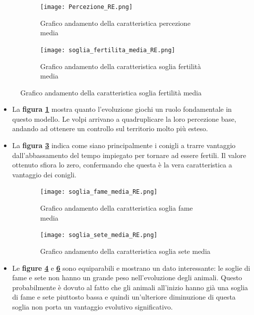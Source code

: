\documentclass[11pt]{article}
\begin{document}
\begin{figure}[h!]
	\begin{subfigure}{\textwidth}
         \centering
         \texttt{[image: Percezione\_RE.png]}
         \caption{Grafico andamento della caratteristica percezione media}
         \label{fig:percezioneRE}
	\end{subfigure}
	\begin{subfigure}{\textwidth}
		\centering
        \texttt{[image: soglia\_fertilita\_media\_RE.png]}
        \caption{Grafico andamento della caratteristica soglia fertilità media}
        \label{fig:fertilitaRE}
	\end{subfigure}
\end{figure}

\begin{itemize}


    \item La \textbf{figura \ref{fig:percezioneRE}} mostra quanto l'evoluzione giochi un ruolo fondamentale in questo modello. Le volpi arrivano a quadruplicare la loro percezione base, andando ad ottenere un controllo sul territorio molto più esteso.

    \item La \textbf{figura \ref{fig:fertilitaRE}} indica come siano principalmente i conigli a trarre vantaggio dall'abbassamento del tempo impiegato per tornare ad essere fertili. Il valore ottenuto sfiora lo zero, confermando che questa è la vera caratteristica a vantaggio dei conigli. 
\end{itemize}

\newpage

\begin{figure}[h!]
	\begin{subfigure}{\textwidth}
         \centering
         \texttt{[image: soglia\_fame\_media\_RE.png]}
         \caption{Grafico andamento della caratteristica soglia fame media}
         \label{fig:FameRE}
	\end{subfigure}
	\begin{subfigure}{\textwidth}
		\centering
        \texttt{[image: soglia\_sete\_media\_RE.png]}
        \caption{Grafico andamento della caratteristica soglia sete media}
        \label{fig:SeteRE}
	\end{subfigure}
	\caption{}
\end{figure}

\begin{itemize}


    \item Le \textbf{figure \ref{fig:FameRE}} e \textbf{\ref{fig:SeteRE}} sono equiparabili e mostrano un dato interessante: le soglie di fame e sete non hanno un grande peso nell'evoluzione degli animali. Questo probabilmente è dovuto al fatto che gli animali all'inizio hanno già una soglia di fame e sete piuttosto bassa e quindi un'ulteriore diminuzione di questa soglia non porta un vantaggio evolutivo significativo.
\end{itemize}
\end{document}

